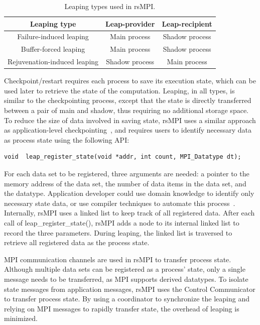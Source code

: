 \begin{table}[!h]
\caption{Leaping types used in rsMPI.}
\centering
\begin{tabular}{|c | c | c |}
\hline 
Leaping type & Leap-provider  & Leap-recipient  \\
\hline \hline 
Failure-induced leaping & Main process & Shadow process \\
\hline
Buffer-forced leaping & Main process & Shadow process \\
\hline
Rejuvenation-induced leaping & Shadow process & Main process \\
\hline
\end{tabular}
\label{tbl:srmpi_leaping}
\end{table}


Checkpoint/restart requires each process to save its execution state, which can be used later to retrieve the state of the computation. 
Leaping, in all types, is similar to the checkpointing process, except that the state is directly transferred between a pair of main and shadow, thus requiring no additional storage space. 
To reduce the size of data involved in saving state, rsMPI uses a similar approach as application-level checkpointing~\cite{beguelin1997application,ni_2013_acr}, and requires users to identify necessary data as process state using the following API:

\begin{lstlisting}
void  leap_register_state(void *addr, int count, MPI_Datatype dt);
\end{lstlisting}

For each data set to be registered, three arguments are needed: a pointer to the memory address of the data set, the number of data items in the data set, and the datatype. 
Application developer could use domain knowledge to identify only necessary state data, or use compiler techniques to automate this process~\cite{Bronevetsky:09:Compiler}. 
Internally, rsMPI uses a linked list to keep track of all registered data. After each call of leap\_register\_state(), rsMPI adds a node to its internal linked list to record the three parameters. 
During leaping, the linked list is traversed to retrieve all registered data as the process state.

MPI communication channels are used in rsMPI to transfer process state. Although multiple data sets can be registered as a process' state, only a single message needs to be transferred, as MPI supports derived datatypes. To isolate state messages from application messages, rsMPI uses the Control Communicator to transfer process state.  
By using a coordinator to synchronize the leaping and relying on  MPI messages to rapidly transfer state, the overhead of leaping is minimized. 

